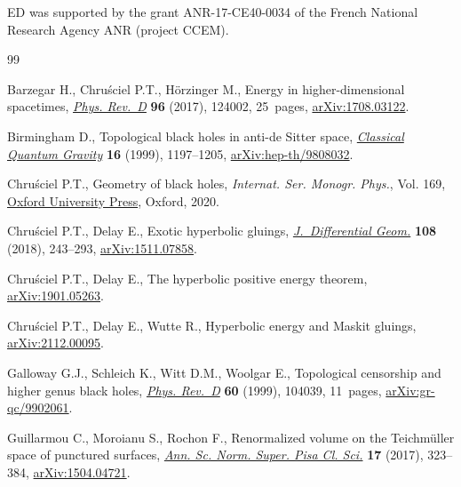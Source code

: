 \documentclass[pdftex]{sigma}
\numberwithin{equation}{section}
\begin{document}
ED was supported by the grant ANR-17-CE40-0034 of the French National Research Agency ANR (project CCEM).

\begin{thebibliography}{99}
\footnotesize\itemsep=0pt
\providecommand{\eprint}[2][]{\href{https://arxiv.org/abs/#2}{arXiv:#2}}

Barzegar H., Chru\'sciel P.T., H\"orzinger M., Energy in higher-dimensional
 spacetimes, \href{https://doi.org/10.1103/physrevd.96.124002}{\textit{Phys. Rev.~D}} \textbf{96} (2017), 124002, 25~pages,
 \href{https://arxiv.org/abs/1708.03122}{arXiv:1708.03122}.

Birmingham D., Topological black holes in anti-de {S}itter space,
 \href{https://doi.org/10.1088/0264-9381/16/4/009}{\textit{Classical Quantum Gravity}} \textbf{16} (1999), 1197--1205,
 \href{https://arxiv.org/abs/hep-th/9808032}{arXiv:hep-th/9808032}.

Chru\'sciel P.T., Geometry of black holes, \textit{Internat. Ser. Monogr.
 Phys.}, Vol. 169, \href{https://doi.org/10.1093/oso/9780198855415.001.0001}{Oxford University Press}, Oxford, 2020.

Chru\'sciel P.T., Delay E., Exotic hyperbolic gluings, \href{https://doi.org/10.4310/jdg/1518490818}{\textit{J.~Differential
 Geom.}} \textbf{108} (2018), 243--293, \href{https://arxiv.org/abs/1511.07858}{arXiv:1511.07858}.

Chru\'sciel P.T., Delay E., The hyperbolic positive energy theorem,
 \href{https://arxiv.org/abs/}{arXiv:1901.05263}.

Chru\'sciel P.T., Delay E., Wutte R., Hyperbolic energy and {M}askit gluings,
 \href{https://arxiv.org/abs/2112.00095}{arXiv:2112.00095}.

Galloway G.J., Schleich K., Witt D.M., Woolgar E., Topological censorship and
 higher genus black holes, \href{https://doi.org/10.1103/PhysRevD.60.104039}{\textit{Phys. Rev.~D}} \textbf{60} (1999), 104039,
 11~pages, \href{https://arxiv.org/abs/gr-qc/9902061}{arXiv:gr-qc/9902061}.

Guillarmou C., Moroianu S., Rochon F., Renormalized volume on the
 {T}eichm\"uller space of punctured surfaces, \href{https://doi.org/10.2422/2036-2145.201506_002}{\textit{Ann. Sc. Norm. Super.
 Pisa Cl. Sci.}} \textbf{17} (2017), 323--384, \href{https://arxiv.org/abs/1504.04721}{arXiv:1504.04721}.


\end{thebibliography}
\end{document}
